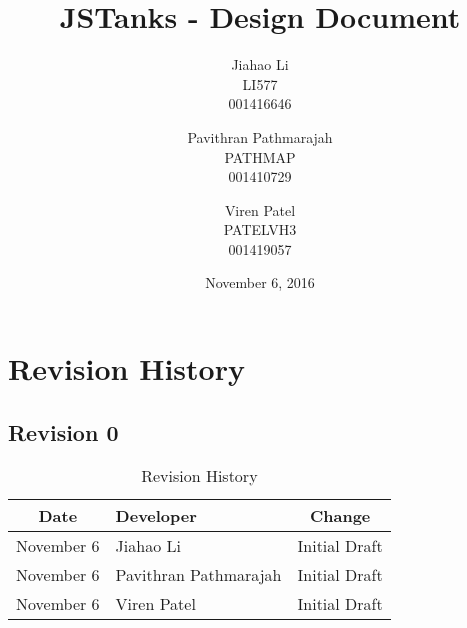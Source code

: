 \documentclass{article}
\begin{document}
\newpage
\title{JSTanks - Design Document}
\date{November 6, 2016}
\author{Jiahao Li\\LI577\\001416646\and Pavithran Pathmarajah\\PATHMAP\\
001410729 \and Viren Patel\\PATELVH3\\001419057}

\maketitle

\newpage
{}
\tableofcontents

\newpage
\section{Revision History}
\subsection{Revision 0}
\begin{table}[H]
\caption{Revision History}
	\begin{tabularx}{\textwidth}{cXc}
		\toprule
		Date & Developer & Change\\
		\midrule
		November 6&Jiahao Li &Initial Draft \\
		November 6&Pavithran Pathmarajah &Initial Draft\\
		November 6&Viren Patel  &Initial Draft\\
	\end{tabularx}
\end{table}
\end{document}
